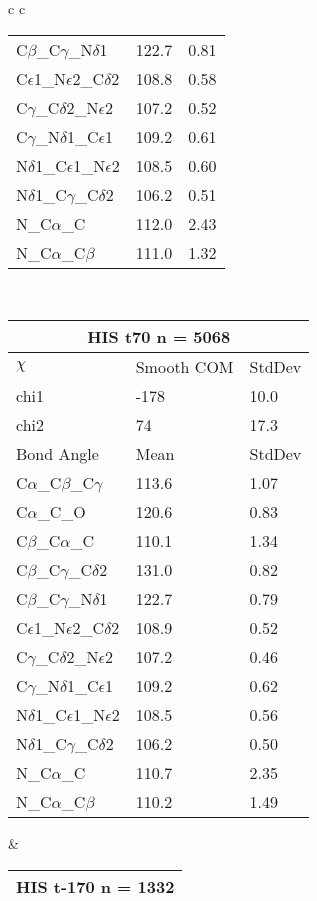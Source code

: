 \begin{longtable}{ c c }
\begin{tabular}{ l l l }
  C$\beta$\_C$\gamma$\_N$\delta$1 & 122.7 & 0.81\\
  C$\epsilon$1\_N$\epsilon$2\_C$\delta$2 & 108.8 & 0.58\\
  C$\gamma$\_C$\delta$2\_N$\epsilon$2 & 107.2 & 0.52\\
  C$\gamma$\_N$\delta$1\_C$\epsilon$1 & 109.2 & 0.61\\
  N$\delta$1\_C$\epsilon$1\_N$\epsilon$2 & 108.5 & 0.60\\
  N$\delta$1\_C$\gamma$\_C$\delta$2 & 106.2 & 0.51\\
  N\_C$\alpha$\_C & 112.0 & 2.43\\
  N\_C$\alpha$\_C$\beta$ & 111.0 & 1.32\\
  \bottomrule
  \end{tabular}
  \\
  \begin{tabular}{ l l l }
  \toprule
  \multicolumn{3}{c}{HIS \textbf{t70} n = 5068} \\ \toprule
  $\chi$       & Smooth COM & StdDev \\ \midrule
  chi1 & -178 & 10.0 \\ 
  chi2 & 74 & 17.3 \\ \midrule
  Bond Angle   & Mean     & StdDev \\ \midrule
  C$\alpha$\_C$\beta$\_C$\gamma$ & 113.6 & 1.07\\
  C$\alpha$\_C\_O & 120.6 & 0.83\\
  C$\beta$\_C$\alpha$\_C & 110.1 & 1.34\\
  C$\beta$\_C$\gamma$\_C$\delta$2 & 131.0 & 0.82\\
  C$\beta$\_C$\gamma$\_N$\delta$1 & 122.7 & 0.79\\
  C$\epsilon$1\_N$\epsilon$2\_C$\delta$2 & 108.9 & 0.52\\
  C$\gamma$\_C$\delta$2\_N$\epsilon$2 & 107.2 & 0.46\\
  C$\gamma$\_N$\delta$1\_C$\epsilon$1 & 109.2 & 0.62\\
  N$\delta$1\_C$\epsilon$1\_N$\epsilon$2 & 108.5 & 0.56\\
  N$\delta$1\_C$\gamma$\_C$\delta$2 & 106.2 & 0.50\\
  N\_C$\alpha$\_C & 110.7 & 2.35\\
  N\_C$\alpha$\_C$\beta$ & 110.2 & 1.49\\
  \bottomrule
  \end{tabular}
  &
  \begin{tabular}{ l l l }
  \toprule
  \multicolumn{3}{c}{HIS \textbf{t-170} n = 1332} \\ \toprule

\end{tabular}
\end{longtable}
